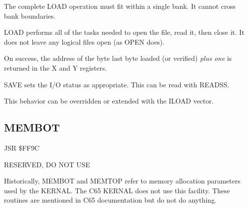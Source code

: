 \begin{description}[leftmargin=2cm,style=nextline]
        The complete LOAD operation must fit within a single bank. It cannot cross bank boundaries.

        LOAD performs all of the tasks needed to open the file, read it, then close it. It does not leave any logical files open (as OPEN does).

        On success, the address of the byte last byte loaded (or verified) \emph{plus one} is returned in the X and Y registers.

        SAVE sets the I/O status as appropriate. This can be read with READSS.

        This behavior can be overridden or extended with the ILOAD vector.
    \item [Example:]
\end{description}



\newpage
\subsection{MEMBOT}
\label{KERNAL Jump Table!MEMBOT}
\begin{description}[leftmargin=2cm,style=nextline]
    \item [Address:] JSR \$FF9C
    \item [Description:] RESERVED, DO NOT USE
    \item [Remarks:]
        Historically, MEMBOT and MEMTOP refer to memory allocation parameters used by the KERNAL. The C65 KERNAL does not use this facility. These routines are mentioned in C65 documentation but do not do anything.
\end{description}


